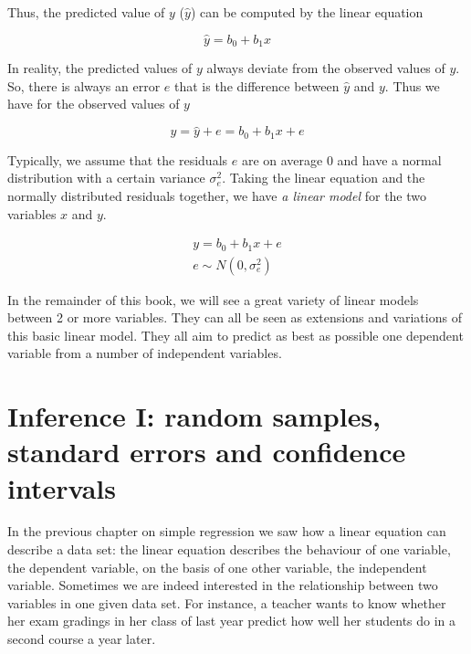 \documentclass[]{report}\usepackage[]{graphicx}\usepackage[]{color}
\begin{document}
Thus, the predicted value of $y$ ($\hat{y}$) can be computed by the linear equation

\begin{equation}
\hat{y}= b_0 + b_1 x
\end{equation}

In reality, the predicted values of $y$ always deviate from the observed values of $y$. So, there is always an error $e$ that is the difference between $\hat{y}$ and $y$. Thus we have for the observed values of $y$

\begin{equation}
y = \hat{y} + e = b_0 + b_1 x + e
\end{equation}

Typically, we assume that the residuals $e$ are on average 0 and have a normal distribution with a certain variance $\sigma^2_e$. Taking the linear equation and the normally distributed residuals together, we have \textit{a linear model} for the two variables $x$ and $y$.


\begin{eqnarray}
y = b_0 + b_1 x + e \\
e \sim N(0,\sigma^2_e)
\end{eqnarray}

In the remainder of this book, we will see a great variety of linear models between 2 or more variables. They can all be seen as extensions and variations of this basic linear model. They all aim to predict as best as possible one dependent variable from a number of independent variables. %

        



\chapter{Inference I: random samples, standard errors and confidence intervals}

In the previous chapter on simple regression we saw how a linear equation can describe a data set: the linear equation describes the behaviour of one variable, the dependent variable, on the basis of one other variable, the independent variable. Sometimes we are indeed interested in the relationship between two variables in one given data set. For instance, a teacher wants to know whether her exam gradings in her class of last year predict how well her students do in a second course a year later.
\end{document}
